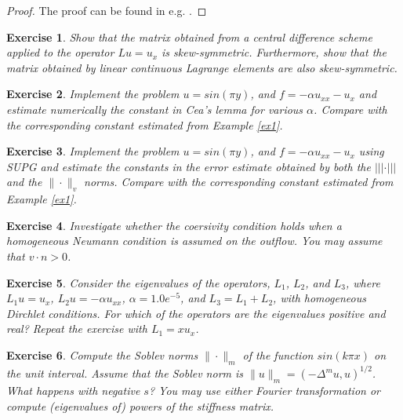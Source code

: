 \documentclass[a4paper,11pt]{amsart}
\newcommand{\norm}[1]{ |\!|\!| #1 |\!|\!|}
\newtheorem{exercise}{Exercise}[section]
\begin{document}
\begin{proof}
The proof can be found in e.g. \cite{elman2005finite, quarteroni2008numerical}. 
\end{proof}


\begin{exercise}
Show that the matrix obtained from a central difference scheme applied to 
the operator $L u = u_x$ is skew-symmetric. Furthermore, show that
the matrix obtained by linear continuous Lagrange elements are also 
skew-symmetric.  
\end{exercise}

\begin{exercise}
Implement the problem $u=sin(\pi y)$, and $f = -\alpha u_{xx} - u_x$ and 
estimate numerically the constant in Cea's lemma for various $\alpha $.       
Compare with the corresponding constant estimated from Example \ref{ex1}. 
\end{exercise}

\begin{exercise}
Implement the problem $u=sin(\pi y)$, and $f = -\alpha u_{xx} - u_x$ using
SUPG and estimate the constants in the error estimate obtained by 
both the $\norm{\cdot}$ and  the $\| \cdot \|_{v}$      
norms. 
Compare with the corresponding constant estimated from Example \ref{ex1}. 
\end{exercise}

 
 
\begin{exercise}
Investigate whether the coersivity condition holds when a 
homogeneous Neumann condition is assumed on the outflow. 
You may assume that $v\cdot n > 0$.   
\end{exercise}

\begin{exercise}
Consider the eigenvalues of the operators, 
$L_1$, $L_2$, and $L_3$, where
$L_1 u = u_x$, $L_2 u = -\alpha u_{xx}$, $\alpha=1.0e^{-5}$, 
and $L_3 = L_1 + L_2$, with homogeneous Dirchlet conditions. 
For which of the operators are the eigenvalues positive and
real? Repeat the exercise with $L_1 = x u_x$.   
\end{exercise}


\begin{exercise}
Compute the Soblev norms $\|\cdot\|_m$ of the function $sin(k \pi x)$ on 
the unit interval. Assume that the Soblev norm is $\|u\|_m = (-\Delta^m u, u)^{1/2}$.     
What happens with negative $s$? You may use either Fourier transformation or 
compute (eigenvalues of) powers of the stiffness matrix. 
\end{exercise}
\end{document}
